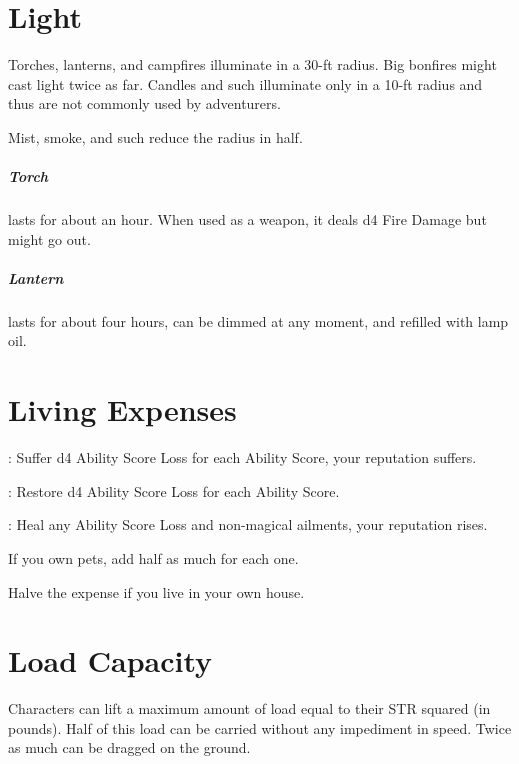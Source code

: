\documentclass[itdr]{subfiles}
\begin{document}
\vfill

\section{Light}

Torches, lanterns, and campfires illuminate in a \mbox{30-ft} radius. Big bonfires might cast light twice as far. Candles and such illuminate only in a 10-ft radius and thus are not commonly used by adventurers.

Mist, smoke, and such reduce the radius in half.

\subparagraph{Torch} lasts for about an hour. When used as a weapon, it deals d4 Fire Damage but might go out.

\subparagraph{Lantern} lasts for about four hours, can be dimmed at any moment, and refilled with lamp oil.

\vfill

\section{Living Expenses}

:
Suffer d4 Ability Score Loss for each Ability Score, your reputation suffers.

:
Restore d4 Ability Score Loss for each Ability Score.

:
Heal any Ability Score Loss and non-magical ailments, your reputation rises.

If you own pets, add half as much for each one.

Halve the expense if you live in your own house.

\break

\section{Load Capacity}

Characters can lift a maximum amount of load equal to their STR squared (in pounds). Half of this load can be carried without any impediment in speed. Twice as much can be dragged on the ground.
\end{document}
